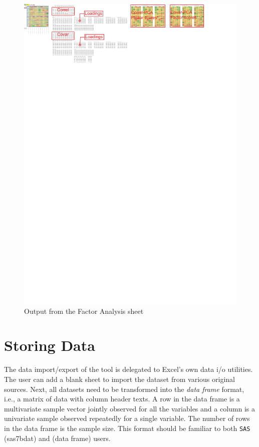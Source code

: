 \documentclass[article]{jss}
\begin{document}
        \begin{figure}[!tbh]
          \includegraphics[width=\linewidth,keepaspectratio=true]{img/FactorSheetOutput_markup}
          \vspace{-20pt}\centering{}\protect\caption{Output from the Factor Analysis sheet}\label{fig:FactorSheetOutput_markup}
        \end{figure}

        
        \section[data]{Storing Data}
        The data import/export of the tool is delegated to Excel's own data i/o utilities. The user can add a blank sheet to import the dataset from various original sources. Next, all datasets need to be transformed into the \textit{data frame} format, i.e., a matrix of data with column header texts. A row in the data frame is a multivariate sample vector jointly observed for all the variables and a column is a univariate sample observed repeatedly for a single variable. The number of rows in the data frame is the sample size. This format should be familiar to both \texttt{SAS} (sas7bdat) and  (data frame) users. 
        
\end{document}
